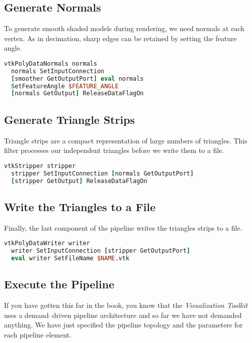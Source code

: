\subsection{Generate Normals}
To generate smooth shaded models during rendering, we need normals at each vertex. As in decimation, sharp edges can be retained by setting the feature angle.

\begin{lstlisting}[language=TCL, caption={Generate Normals.}]
vtkPolyDataNormals normals
  normals SetInputConnection
  [smoother GetOutputPort] eval normals
  SetFeatureAngle $FEATURE_ANGLE
  [normals GetOutput] ReleaseDataFlagOn
\end{lstlisting}

\subsection{Generate Triangle Strips}

Triangle strips are a compact representation of large numbers of triangles. This filter processes our independent triangles before we write them to a file.

\begin{lstlisting}[language=TCL, caption={Generate Triangle Strips.}]
vtkStripper stripper
  stripper SetInputConnection [normals GetOutputPort]
  [stripper GetOutput] ReleaseDataFlagOn
\end{lstlisting}

\subsection{Write the Triangles to a File}

Finally, the last component of the pipeline writes the triangles strips to a file.

\begin{lstlisting}[language=TCL, caption={Write the Triangles to a File.}]
vtkPolyDataWriter writer
  writer SetInputConnection [stripper GetOutputPort]
  eval writer SetFileName $NAME.vtk
\end{lstlisting}

\subsection{Execute the Pipeline}

If you have gotten this far in the book, you know that the \emph{Visualization Toolkit} uses a demand--driven pipeline architecture and so far we have not demanded anything. We have just specified the pipeline topology and the parameters for each pipeline element.

